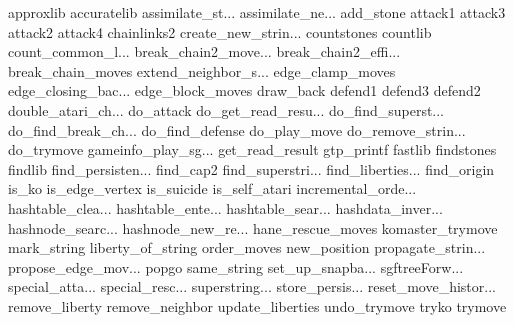 approxlib
accuratelib
assimilate_st...
assimilate_ne...
add_stone
attack1
attack3
attack2
attack4
chainlinks2
create_new_strin...
countstones
countlib
count_common_l...
break_chain2_move...
break_chain2_effi...
break_chain_moves
extend_neighbor_s...
edge_clamp_moves
edge_closing_bac...
edge_block_moves
draw_back
defend1
defend3
defend2
double_atari_ch...
do_attack
do_get_read_resu...
do_find_superst...
do_find_break_ch...
do_find_defense
do_play_move
do_remove_strin...
do_trymove
gameinfo_play_sg...
get_read_result
gtp_printf
fastlib
findstones
findlib
find_persisten...
find_cap2
find_superstri...
find_liberties...
find_origin
is_ko
is_edge_vertex
is_suicide
is_self_atari
incremental_orde...
hashtable_clea...
hashtable_ente...
hashtable_sear...
hashdata_inver...
hashnode_searc...
hashnode_new_re...
hane_rescue_moves
komaster_trymove
mark_string
liberty_of_string
order_moves
new_position
propagate_strin...
propose_edge_mov...
popgo
same_string
set_up_snapba...
sgftreeForw...
special_atta...
special_resc...
superstring...
store_persis...
reset_move_histor...
remove_liberty
remove_neighbor
update_liberties
undo_trymove
tryko
trymove
